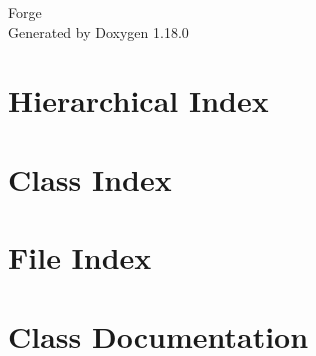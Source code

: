 \documentclass[twoside]{book}
\newcommand{\+}{\discretionary{\mbox{\scriptsize$\hookleftarrow$}}{}{}}
\newcommand{\clearemptydoublepage}{%
    \newpage{\pagestyle{empty}\cleardoublepage}%
  }
\begin{document}
  \raggedbottom
    \hypersetup{pageanchor=false,
                bookmarksnumbered=true,
                pdfencoding=unicode
               }
  \begin{titlepage}
  \vspace*{7cm}
  \begin{center}%
  {\Large Forge}\\
  \vspace*{1cm}
  {\large Generated by Doxygen 1.18.0}\\
  \end{center}
  \end{titlepage}
  \clearemptydoublepage
  \tableofcontents
  \clearemptydoublepage
  \hypersetup{pageanchor=true}
\chapter{Hierarchical Index}

\chapter{Class Index}

\chapter{File Index}

\chapter{Class Documentation}




















\end{document}
